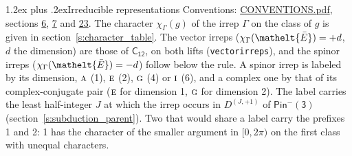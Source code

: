 \documentclass[10pt,a4paper]{article}
\makeatletter
\renewcommand\section{\@startsection{section}{1}{\z@}{-3ex plus -1ex minus -.2ex}%
  {1.2ex plus .2ex}{\normalfont\large\sffamily\bfseries\color{parttitle}}}
\numberwithin{equation}{section}
\newcommand{\eltfont}[1]{{\let\sigma\eltsigma\mathelt{#1}}}
\newcommand{\grp}[1]{\mathsf{#1}}
\newcommand{\irr}[1]{\text{\normalfont\scshape #1}}
\newcommand{\elt}[1]{\eltfont{#1}}
\newcommand{\irrJp}[2]{D^{(#1,#2)}}
\newcommand{\irchar}[1]{\chi_{#1}}
\newcommand{\barred}[1]{\bar{#1}}
\makeatother
\begin{document}
\section{Irreducible representations}\label{s:irreps}
Conventions: \href{../../CONVENTIONS.pdf}{CONVENTIONS.pdf}, sections \href{../../../rotation/CONVENTIONS.pdf\#conv.6}{6}, \href{../../../rotation/CONVENTIONS.pdf\#conv.7}{7} and \href{../../CONVENTIONS.pdf\#conv.23}{23}.
\leavevmode\label{n:function.character}\label{n:irrep.Gamma}The character $\irchar{\Gamma}(g)$ of the irrep $\Gamma$ on the class of $g$ is given in section~\ref{s:character_table}. \label{n:index.dimension}The vector irreps ($\irchar{\Gamma}(\elt{\barred{E}}) = +d$, $d$ the dimension) are those of \href{../../../rotation/data/pdf/C12.pdf}{$\grp{C_{12}}$}, on both lifts (\texttt{vectorirreps}), and the spinor irreps ($\irchar{\Gamma}(\elt{\barred{E}}) = -d$) follow below the rule. A spinor irrep is labeled by its dimension, $\irr{a}$ (1), $\irr{e}$ (2), $\irr{g}$ (4) or $\irr{i}$ (6), and a complex one by that of its complex-conjugate pair ($\irr{e}$ for dimension 1, $\irr{g}$ for dimension 2). The label carries the least half-integer $J$ at which the irrep occurs in $\irrJp{J}{+1}$ of $\grp{Pin^{-}(3)}$ (section~\ref{s:subduction_parent}). Two that would share a label carry the prefixes 1 and 2: 1 has the character of the smaller argument in $[0, 2\pi)$ on the first class with unequal characters.
\end{document}
